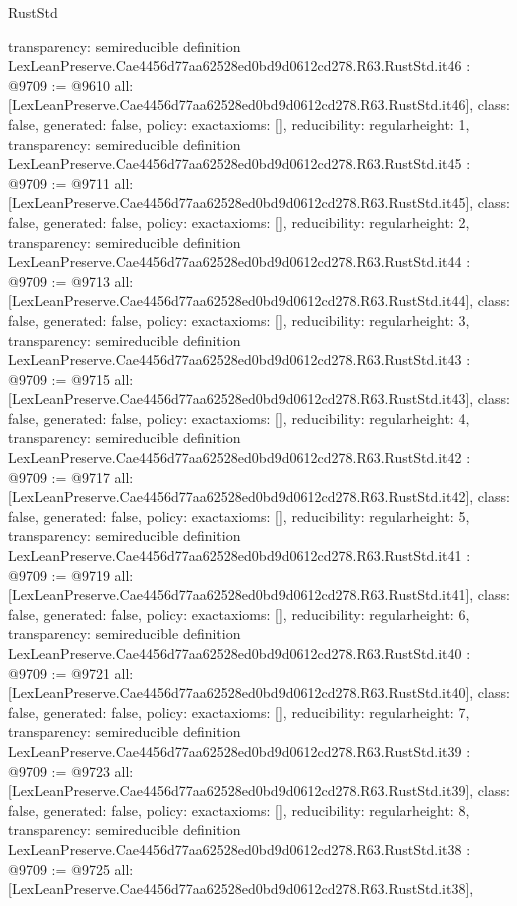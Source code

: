 \begin{lexlean}{RustStd}
\begin{coremodule}
{  transparency: semireducible
}
definition LexLeanPreserve.Cae4456d77aa62528ed0bd9d0612cd278.R63.RustStd.it46 : @9709 := @9610 {
  all: [LexLeanPreserve.Cae4456d77aa62528ed0bd9d0612cd278.R63.RustStd.it46],
  class: false,
  generated: false,
  policy: exact{axioms: []},
  reducibility: regular{height: 1},
  transparency: semireducible
}
definition LexLeanPreserve.Cae4456d77aa62528ed0bd9d0612cd278.R63.RustStd.it45 : @9709 := @9711 {
  all: [LexLeanPreserve.Cae4456d77aa62528ed0bd9d0612cd278.R63.RustStd.it45],
  class: false,
  generated: false,
  policy: exact{axioms: []},
  reducibility: regular{height: 2},
  transparency: semireducible
}
definition LexLeanPreserve.Cae4456d77aa62528ed0bd9d0612cd278.R63.RustStd.it44 : @9709 := @9713 {
  all: [LexLeanPreserve.Cae4456d77aa62528ed0bd9d0612cd278.R63.RustStd.it44],
  class: false,
  generated: false,
  policy: exact{axioms: []},
  reducibility: regular{height: 3},
  transparency: semireducible
}
definition LexLeanPreserve.Cae4456d77aa62528ed0bd9d0612cd278.R63.RustStd.it43 : @9709 := @9715 {
  all: [LexLeanPreserve.Cae4456d77aa62528ed0bd9d0612cd278.R63.RustStd.it43],
  class: false,
  generated: false,
  policy: exact{axioms: []},
  reducibility: regular{height: 4},
  transparency: semireducible
}
definition LexLeanPreserve.Cae4456d77aa62528ed0bd9d0612cd278.R63.RustStd.it42 : @9709 := @9717 {
  all: [LexLeanPreserve.Cae4456d77aa62528ed0bd9d0612cd278.R63.RustStd.it42],
  class: false,
  generated: false,
  policy: exact{axioms: []},
  reducibility: regular{height: 5},
  transparency: semireducible
}
definition LexLeanPreserve.Cae4456d77aa62528ed0bd9d0612cd278.R63.RustStd.it41 : @9709 := @9719 {
  all: [LexLeanPreserve.Cae4456d77aa62528ed0bd9d0612cd278.R63.RustStd.it41],
  class: false,
  generated: false,
  policy: exact{axioms: []},
  reducibility: regular{height: 6},
  transparency: semireducible
}
definition LexLeanPreserve.Cae4456d77aa62528ed0bd9d0612cd278.R63.RustStd.it40 : @9709 := @9721 {
  all: [LexLeanPreserve.Cae4456d77aa62528ed0bd9d0612cd278.R63.RustStd.it40],
  class: false,
  generated: false,
  policy: exact{axioms: []},
  reducibility: regular{height: 7},
  transparency: semireducible
}
definition LexLeanPreserve.Cae4456d77aa62528ed0bd9d0612cd278.R63.RustStd.it39 : @9709 := @9723 {
  all: [LexLeanPreserve.Cae4456d77aa62528ed0bd9d0612cd278.R63.RustStd.it39],
  class: false,
  generated: false,
  policy: exact{axioms: []},
  reducibility: regular{height: 8},
  transparency: semireducible
}
definition LexLeanPreserve.Cae4456d77aa62528ed0bd9d0612cd278.R63.RustStd.it38 : @9709 := @9725 {
  all: [LexLeanPreserve.Cae4456d77aa62528ed0bd9d0612cd278.R63.RustStd.it38],
}
\end{coremodule}
\end{lexlean}
